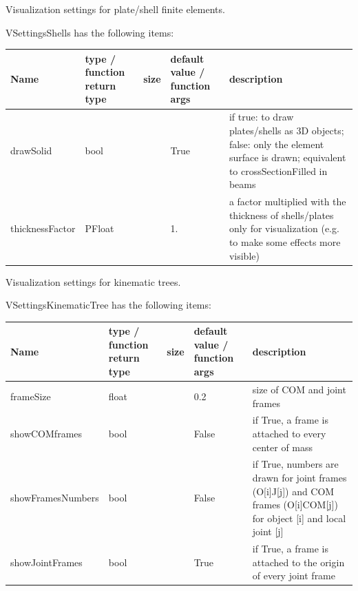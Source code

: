 
\label{sec:VSettingsShells}
Visualization settings for plate/shell finite elements.

\noindent VSettingsShells has the following items:
\begin{center}
  \footnotesize
  \begin{longtable}{| p{4.2cm} | p{2.5cm} | p{0.3cm} | p{3.0cm} | p{6cm} |}
    \hline
    \bf Name & \bf type / function return type & \bf size & \bf default value / function args & \bf description \\ \hline
    drawSolid &     bool &      &     True &     if true: to draw plates/shells as 3D objects; false: only the element surface is drawn; equivalent to crossSectionFilled in beams\\ \hline
    thicknessFactor &     PFloat &      &     1. &     a factor multiplied with the thickness of shells/plates only for visualization (e.g. to make some effects more visible)\\ \hline
	  \end{longtable}
	\end{center}



\label{sec:VSettingsKinematicTree}
Visualization settings for kinematic trees.

\noindent VSettingsKinematicTree has the following items:
\begin{center}
  \footnotesize
  \begin{longtable}{| p{4.2cm} | p{2.5cm} | p{0.3cm} | p{3.0cm} | p{6cm} |}
    \hline
    \bf Name & \bf type / function return type & \bf size & \bf default value / function args & \bf description \\ \hline
    frameSize &     float &      &     0.2 &     size of COM and joint frames\\ \hline
    showCOMframes &     bool &      &     False &     if True, a frame is attached to every center of mass\\ \hline
    showFramesNumbers &     bool &      &     False &     if True, numbers are drawn for joint frames (O[i]J[j]) and COM frames (O[i]COM[j]) for object [i] and local joint [j]\\ \hline
    showJointFrames &     bool &      &     True &     if True, a frame is attached to the origin of every joint frame\\ \hline
	  \end{longtable}
	\end{center}


